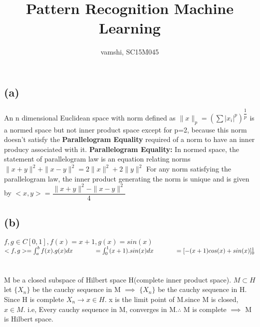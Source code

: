 \documentclass[12pt,a4paper]{article}
\title{Pattern Recognition Machine Learning}
\author{vamshi, SC15M045}
\begin{document}
	\maketitle
	\newpage
	\section{}
	\subsection*{(a)}
	An n dimensional Euclidean space with norm defined as $ \|x\|_p = {(\sum {{|x_i|}^p})}^{\dfrac{1}{p}}  $ is a normed space but not inner product space except for p=2, because this norm doesn't satisfy the \textbf{Parallelogram Equality} required of a norm to have an inner producy associated with it. \newline
	\textbf{Parallelogram Equality:} \newline
	In normed space, the statement of parallelogram law is an equation relating norms\newline
	\hspace*{10ex} $ \|x+y\|^2 + \|x-y\|^2 = 2\|x\|^2 + 2\|y\|^2 $ \newline
	For any norm satisfying the parallelogram law, the inner product generating the norm is unique and is given by \newline
	\hspace*{10ex} $ <x,y> = \dfrac{\|x+y\|^2 - \|x-y\|^2}{4} $
	\subsection*{(b)}
	 $ f,g \in C[0,1], f(x) = x+1 , g(x) = sin(x) $\newline
	 $ <f,g> = \int_{a}^{b} f(x).g(x) dx \newline \hspace*{8ex} =\int_{0}^{1} (x+1).sin(x) dx \newline \hspace*{8ex} = [-(x+1)cos(x) + sin(x)]_{0}^{1}$
	 
	 \section{}
	 M be a closed subspace of Hilbert space H(complete inner product space). $ M \subset H $ \newline
	 let $ \{X_n\} $ be the cauchy sequence in M $ \implies $ $ \{X_n\} $ be the cauchy sequence in H. Since H is complete  $ {X_n} \longrightarrow x \in H $. x is the limit point of M.\newline  since M is closed, $ x \in M $. i.e, Every cauchy sequence in M, converges in M.\newline $\therefore $  M is complete $ \implies $ M is Hilbert space.
	 
\end{document}

